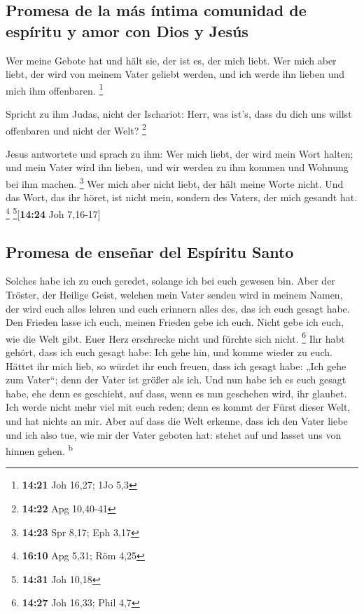 \hypertarget{promesa-de-la-muxe1s-uxedntima-comunidad-de-espuxedritu-y-amor-con-dios-y-jesuxfas}{%
\subsection{Promesa de la más íntima comunidad de espíritu y amor con
Dios y
Jesús}\label{promesa-de-la-muxe1s-uxedntima-comunidad-de-espuxedritu-y-amor-con-dios-y-jesuxfas}}

 Wer meine Gebote hat und hält sie, der ist es, der mich
liebt. Wer mich aber liebt, der wird von meinem Vater geliebt werden,
und ich werde ihn lieben und mich ihm offenbaren. \footnote{\textbf{14:21}
  Joh 16,27; 1Jo 5,3}

 Spricht zu ihm Judas, nicht der Ischariot: Herr, was
ist's, dass du dich uns willst offenbaren und nicht der Welt?
\footnote{\textbf{14:22} Apg 10,40-41}

 Jesus antwortete und sprach zu ihm: Wer mich liebt, der
wird mein Wort halten; und mein Vater wird ihn lieben, und wir werden zu
ihm kommen und Wohnung bei ihm machen. \footnote{\textbf{14:23} Spr
  8,17; Eph 3,17}  Wer mich aber nicht liebt, der hält
meine Worte nicht. Und das Wort, das ihr höret, ist nicht mein, sondern
des Vaters, der mich gesandt hat. \footnote{\textbf{16:10} Apg 5,31; Röm
  4,25} \footnote{\textbf{14:31} Joh 10,18}{[}\textbf{14:24} Joh
7,16-17{]}

\hypertarget{promesa-de-enseuxf1ar-del-espuxedritu-santo}{%
\subsection{Promesa de enseñar del Espíritu
Santo}\label{promesa-de-enseuxf1ar-del-espuxedritu-santo}}

 Solches habe ich zu euch geredet, solange ich bei euch
gewesen bin.  Aber der Tröster, der Heilige Geist,
welchen mein Vater senden wird in meinem Namen, der wird euch alles
lehren und euch erinnern alles des, das ich euch gesagt habe.
 Den Frieden lasse ich euch, meinen Frieden gebe ich
euch. Nicht gebe ich euch, wie die Welt gibt. Euer Herz erschrecke nicht
und fürchte sich nicht. \footnote{\textbf{14:27} Joh 16,33; Phil 4,7}
 Ihr habt gehört, dass ich euch gesagt habe: Ich gehe
hin, und komme wieder zu euch. Hättet ihr mich lieb, so würdet ihr euch
freuen, dass ich gesagt habe: „Ich gehe zum Vater``; denn der Vater ist
größer als ich.  Und nun habe ich es euch gesagt habe,
ehe denn es geschieht, auf dass, wenn es nun geschehen wird, ihr
glaubet.  Ich werde nicht mehr viel mit euch reden; denn
es kommt der Fürst dieser Welt, und hat nichts an mir. 
Aber auf dass die Welt erkenne, dass ich den Vater liebe und ich also
tue, wie mir der Vater geboten hat: stehet auf und lasset uns von hinnen
gehen. \textsuperscript{b}

